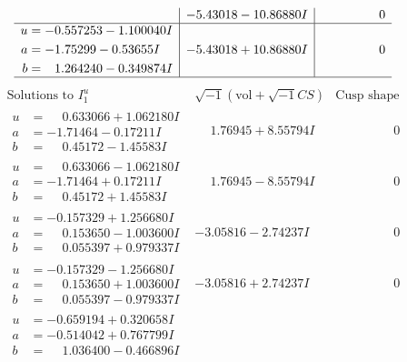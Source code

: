 \documentclass[1p]{elsarticle_modified}
\theoremstyle{definition}
\newcommand{\I}{\sqrt{-1}}
\begin{document}
$$\begin{array}{c|c|c}
 & -5.43018 - 10.86880 I & \phantom{-0.000000 } 0 \\ \hline\begin{aligned}
u &= -0.557253 - 1.100040 I \\
a &= -1.75299 - 0.53655 I \\
b &= \phantom{-}1.264240 - 0.349874 I\end{aligned}
 & -5.43018 + 10.86880 I & \phantom{-0.000000 } 0\\
 \hline 
 \end{array}$$\newpage$$\begin{array}{c|c|c}  
\text{Solutions to }I^u_{1}& \I (\text{vol} + \sqrt{-1}CS) & \text{Cusp shape}\\
 \hline 
\begin{aligned}
u &= \phantom{-}0.633066 + 1.062180 I \\
a &= -1.71464 - 0.17211 I \\
b &= \phantom{-}0.45172 - 1.45583 I\end{aligned}
 & \phantom{-}1.76945 + 8.55794 I & \phantom{-0.000000 } 0 \\ \hline\begin{aligned}
u &= \phantom{-}0.633066 - 1.062180 I \\
a &= -1.71464 + 0.17211 I \\
b &= \phantom{-}0.45172 + 1.45583 I\end{aligned}
 & \phantom{-}1.76945 - 8.55794 I & \phantom{-0.000000 } 0 \\ \hline\begin{aligned}
u &= -0.157329 + 1.256680 I \\
a &= \phantom{-}0.153650 - 1.003600 I \\
b &= \phantom{-}0.055397 + 0.979337 I\end{aligned}
 & -3.05816 - 2.74237 I & \phantom{-0.000000 } 0 \\ \hline\begin{aligned}
u &= -0.157329 - 1.256680 I \\
a &= \phantom{-}0.153650 + 1.003600 I \\
b &= \phantom{-}0.055397 - 0.979337 I\end{aligned}
 & -3.05816 + 2.74237 I & \phantom{-0.000000 } 0 \\ \hline\begin{aligned}
u &= -0.659194 + 0.320658 I \\
a &= -0.514042 + 0.767799 I \\
b &= \phantom{-}1.036400 - 0.466896 I\end{aligned}

\end{array}$$
\end{document}
